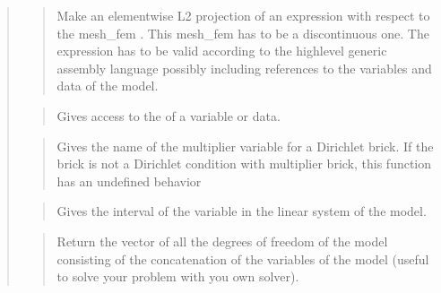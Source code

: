 \documentclass[a4paper,11pt,english]{sphinxmanual}
\begin{document}
\begin{quote}
\begin{quote}

Make an elementwise L2 projection of an expression with respect
to the mesh\_fem . This mesh\_fem has to be
a discontinuous one.
The expression has to be valid according to the high\sphinxhyphen{}level generic
assembly language possibly including references to the variables
and data of the model.
\end{quote}

\begin{quote}

Gives access to the  of a variable or data.
\end{quote}

\begin{quote}

Gives the name of the multiplier variable for a Dirichlet brick.
If the brick is not a Dirichlet condition with multiplier brick,
this function has an undefined behavior
\end{quote}

\begin{quote}

Gives the interval of the variable  in the linear system of
the model.
\end{quote}

\begin{quote}

Return the vector of all the degrees of freedom of the model consisting
of the concatenation of the variables of the model (useful
to solve your problem with you own solver).
\end{quote}

\begin{quote}


\end{quote}
\end{quote}
\end{document}
